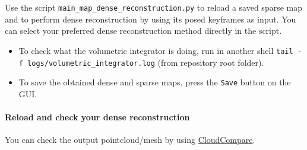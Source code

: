 \documentclass{article}
\providecommand{\tightlist}{%
  \setlength{\itemsep}{0pt}\setlength{\parskip}{0pt}}
\let\oldparagraph\paragraph
\renewcommand{\paragraph}[1]{\oldparagraph{#1}\mbox{}}
\begin{document}
Use the script \texttt{main\_map\_dense\_reconstruction.py} to reload a
saved sparse map and to perform dense reconstruction by using its posed
keyframes as input. You can select your preferred dense reconstruction
method directly in the script.

\begin{itemize}
\tightlist
\item
  To check what the volumetric integrator is doing, run in another shell
  \texttt{tail\ -f\ logs/volumetric\_integrator.log} (from repository
  root folder).
\item
  To save the obtained dense and sparse maps, press the \texttt{Save}
  button on the GUI.
\end{itemize}

\hypertarget{reload-and-check-your-dense-reconstruction}{%
\paragraph{Reload and check your dense
reconstruction}\label{reload-and-check-your-dense-reconstruction}}

You can check the output pointcloud/mesh by using
\href{https://www.cloudcompare.org/}{CloudCompare}.
\end{document}
